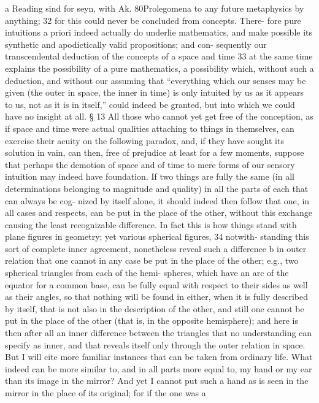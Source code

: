 a
Reading sind for seyn, with Ak.
80Prolegomena to any future metaphysics
by anything; 32 for this could never be concluded from concepts. There-
fore pure intuitions a priori indeed actually do underlie mathematics, and
make possible its synthetic and apodictically valid propositions; and con-
sequently our transcendental deduction of the concepts of a space and
time 33 at the same time explains the possibility of a pure mathematics, a
possibility which, without such a deduction, and without our assuming
that “everything which our senses may be given (the outer in space, the
inner in time) is only intuited by us as it appears to us, not as it is in itself,”
could indeed be granted, but into which we could have no insight at all.
§ 13
All those who cannot yet get free of the conception, as if space and time
were actual qualities attaching to things in themselves, can exercise their
acuity on the following paradox, and, if they have sought its solution in
vain, can then, free of prejudice at least for a few moments, suppose that
perhaps the demotion of space and of time to mere forms of our sensory
intuition may indeed have foundation.
If two things are fully the same (in all determinations belonging to
magnitude and quality) in all the parts of each that can always be cog-
nized by itself alone, it should indeed then follow that one, in all cases
and respects, can be put in the place of the other, without this exchange
causing the least recognizable difference. In fact this is how things stand
with plane ﬁgures in geometry; yet various spherical ﬁgures, 34 notwith-
standing this sort of complete inner agreement, nonetheless reveal such
a difference b in outer relation that one cannot in any case be put in the
place of the other; e.g., two spherical triangles from each of the hemi-
spheres, which have an arc of the equator for a common base, can be fully
equal with respect to their sides as well as their angles, so that nothing
will be found in either, when it is fully described by itself, that is not also
in the description of the other, and still one cannot be put in the place
of the other (that is, in the opposite hemisphere); and here is then after
all an inner difference between the triangles that no understanding can
specify as inner, and that reveals itself only through the outer relation
in space. But I will cite more familiar instances that can be taken from
ordinary life.
What indeed can be more similar to, and in all parts more equal to, my
hand or my ear than its image in the mirror? And yet I cannot put such a
hand as is seen in the mirror in the place of its original; for if the one was a
